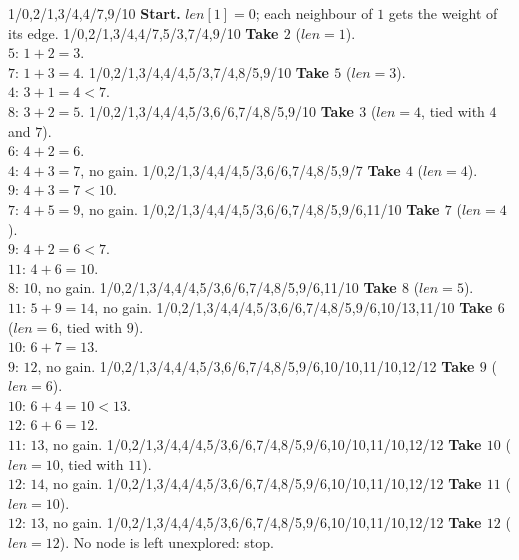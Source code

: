 \documentclass[a4paper,12pt,oneside]{report}
\begin{document}
\medskip
{}
  {1/0,2/1,3/4,4/7,9/10}
  {\textbf{Start.} $\mathit{len}[1]=0$; each neighbour of $1$ gets the
   weight of its edge.}
  {1/0,2/1,3/4,4/7,5/3,7/4,9/10}
  {\textbf{Take $2$} ($\mathit{len}=1$).\\
   $5$: $1+2=3$.\\
   $7$: $1+3=4$.}
  {1/0,2/1,3/4,4/4,5/3,7/4,8/5,9/10}
  {\textbf{Take $5$} ($\mathit{len}=3$).\\
   $4$: $3+1=4<7$.\\
   $8$: $3+2=5$.}
  {1/0,2/1,3/4,4/4,5/3,6/6,7/4,8/5,9/10}
  {\textbf{Take $3$} ($\mathit{len}=4$, tied with $4$ and $7$).\\
   $6$: $4+2=6$.\\
   $4$: $4+3=7$, no gain.}
  {1/0,2/1,3/4,4/4,5/3,6/6,7/4,8/5,9/7}
  {\textbf{Take $4$} ($\mathit{len}=4$).\\
   $9$: $4+3=7<10$.\\
   $7$: $4+5=9$, no gain.}
  {1/0,2/1,3/4,4/4,5/3,6/6,7/4,8/5,9/6,11/10}
  {\textbf{Take $7$} ($\mathit{len}=4$).\\
   $9$: $4+2=6<7$.\\
   $11$: $4+6=10$.\\
   $8$: $10$, no gain.}
  {1/0,2/1,3/4,4/4,5/3,6/6,7/4,8/5,9/6,11/10}
  {\textbf{Take $8$} ($\mathit{len}=5$).\\
   $11$: $5+9=14$, no gain.}
  {1/0,2/1,3/4,4/4,5/3,6/6,7/4,8/5,9/6,10/13,11/10}
  {\textbf{Take $6$} ($\mathit{len}=6$, tied with $9$).\\
   $10$: $6+7=13$.\\
   $9$: $12$, no gain.}
  {1/0,2/1,3/4,4/4,5/3,6/6,7/4,8/5,9/6,10/10,11/10,12/12}
  {\textbf{Take $9$} ($\mathit{len}=6$).\\
   $10$: $6+4=10<13$.\\
   $12$: $6+6=12$.\\
   $11$: $13$, no gain.}
  {1/0,2/1,3/4,4/4,5/3,6/6,7/4,8/5,9/6,10/10,11/10,12/12}
  {\textbf{Take $10$} ($\mathit{len}=10$, tied with $11$).\\
   $12$: $14$, no gain.}
  {1/0,2/1,3/4,4/4,5/3,6/6,7/4,8/5,9/6,10/10,11/10,12/12}
  {\textbf{Take $11$} ($\mathit{len}=10$).\\
   $12$: $13$, no gain.}
  {1/0,2/1,3/4,4/4,5/3,6/6,7/4,8/5,9/6,10/10,11/10,12/12}
  {\textbf{Take $12$} ($\mathit{len}=12$). No node is left unexplored:
   stop.}
\end{document}
